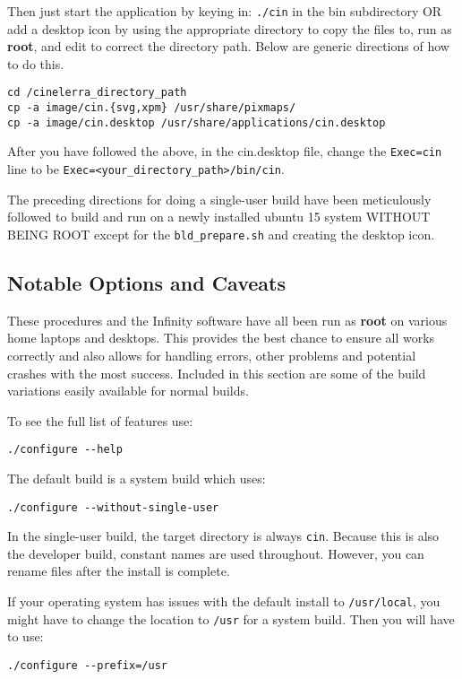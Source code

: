 Then just start the application by keying in: \texttt{./cin} in the
bin subdirectory OR add a desktop icon by using the appropriate
directory to copy the files to, run as \textbf{root}, and edit to
correct the directory path.  Below are generic directions of how to
do this.

\begin{lstlisting}[style=sh]
cd /cinelerra_directory_path
cp -a image/cin.{svg,xpm} /usr/share/pixmaps/
cp -a image/cin.desktop /usr/share/applications/cin.desktop
\end{lstlisting}

After you have followed the above, in the cin.desktop file, change
the \texttt{Exec=cin} line to be
\texttt{Exec=<your\_directory\_path>/bin/cin}.

The preceding directions for doing a single-user build have been
meticulously followed to build and run on a newly installed ubuntu
15 system WITHOUT BEING ROOT except for the \texttt{bld\_prepare.sh}
and creating the desktop icon.


\subsection{Notable Options and Caveats}%
\label{sub:notable_options_and_caveats}

These procedures and the \CGG{} Infinity software have all been run
as \textbf{root} on various home laptops and desktops. This provides
the best chance to ensure all works correctly and also allows for
handling errors, other problems and potential crashes with the most
success.  Included in this section are some of the build variations
easily available for normal builds.

To see the full list of features use:

\begin{lstlisting}[style=sh]
./configure --help
\end{lstlisting}
The default build is a system build which uses:

\begin{lstlisting}[style=sh]
./configure --without-single-user
\end{lstlisting}

In the single-user build, the target directory is always
\texttt{cin}.  Because this is also the developer build, constant
names are used throughout.  However, you can rename files after the
install is complete.

If your operating system has issues with the default install to
\texttt{/usr/local}, you might have to change the location to
\texttt{/usr} for a system build.  Then you will have to use:
\begin{lstlisting}[style=sh]
./configure --prefix=/usr
\end{lstlisting}

